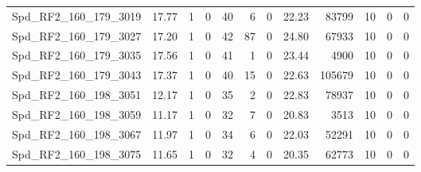 \begin{longtable}[c]{@{}lrrrrrrrrrrr@{}}
Spd\_RF2\_160\_179\_3019     & 17.77                  & 1                       & 0                       & 40                     & 6                       & 0                       & 22.23                   & 83799                    & 10                       & 0                        & 0                        \\
Spd\_RF2\_160\_179\_3027     & 17.20                  & 1                       & 0                       & 42                     & 87                      & 0                       & 24.80                   & 67933                    & 10                       & 0                        & 0                        \\
Spd\_RF2\_160\_179\_3035     & 17.56                  & 1                       & 0                       & 41                     & 1                       & 0                       & 23.44                   & 4900                     & 10                       & 0                        & 0                        \\
Spd\_RF2\_160\_179\_3043     & 17.37                  & 1                       & 0                       & 40                     & 15                      & 0                       & 22.63                   & 105679                   & 10                       & 0                        & 0                        \\
Spd\_RF2\_160\_198\_3051     & 12.17                  & 1                       & 0                       & 35                     & 2                       & 0                       & 22.83                   & 78937                    & 10                       & 0                        & 0                        \\
Spd\_RF2\_160\_198\_3059     & 11.17                  & 1                       & 0                       & 32                     & 7                       & 0                       & 20.83                   & 3513                     & 10                       & 0                        & 0                        \\
Spd\_RF2\_160\_198\_3067     & 11.97                  & 1                       & 0                       & 34                     & 6                       & 0                       & 22.03                   & 52291                    & 10                       & 0                        & 0                        \\
Spd\_RF2\_160\_198\_3075     & 11.65                  & 1                       & 0                       & 32                     & 4                       & 0                       & 20.35                   & 62773                    & 10                       & 0                        & 0                        \\

\end{longtable}
